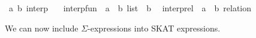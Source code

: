 \documentclass{llncs}
\begin{document}
\begin{isabellebody}
\isanewline
{}\isamarkupfalse%
\ {}{}a{}\ {}b{}\ interp\ {}\isanewline
\ \ interp{}fun\ {}{}\ {}{}a\ {}\ {}b\ list\ {}\ {}b{}\isanewline
\ \ interp{}rel\ {}{}\ {}{}a\ {}\ {}b\ relation{}\isanewline
\end{isabellebody}

We can now include $\Sigma$-expressions into SKAT expressions.
\end{document}
